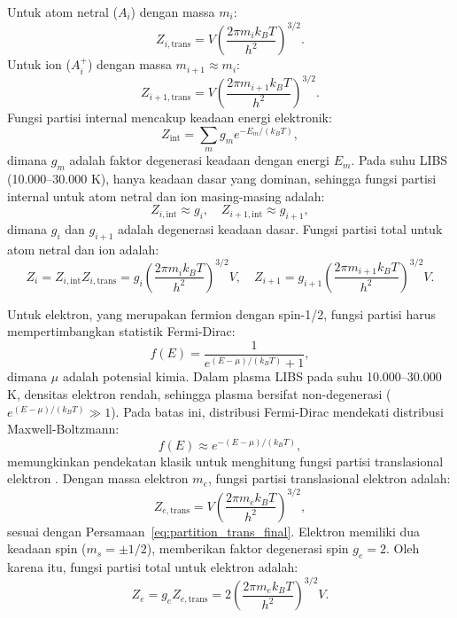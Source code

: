 Untuk atom netral (\( A_i \)) dengan massa \( m_i \):
\begin{equation}
Z_{i,\text{trans}} = V \left( \frac{2\pi m_i k_B T}{h^2} \right)^{3/2}. \label{eq:partition_trans_neutral}
\end{equation}
Untuk ion (\( A_i^+ \)) dengan massa \( m_{i+1} \approx m_i \):
\begin{equation}
Z_{i+1,\text{trans}} = V \left( \frac{2\pi m_{i+1} k_B T}{h^2} \right)^{3/2}. \label{eq:partition_trans_ion}
\end{equation}
Fungsi partisi internal mencakup keadaan energi elektronik:
\begin{equation}
Z_{\text{int}} = \sum_m g_m e^{-E_m/(k_B T)}, \label{eq:partition_internal}
\end{equation}
dimana \( g_m \) adalah faktor degenerasi keadaan dengan energi \( E_m \). Pada suhu LIBS (10.000–30.000 K), hanya keadaan dasar yang dominan, sehingga fungsi partisi internal untuk atom netral dan ion masing-masing adalah:
\[
Z_{i,\text{int}} \approx g_i, \quad Z_{i+1,\text{int}} \approx g_{i+1},
\]
dimana \( g_i \) dan \( g_{i+1} \) adalah degenerasi keadaan dasar. Fungsi partisi total untuk atom netral dan ion adalah:
\begin{equation}
Z_i = Z_{i,\text{int}} Z_{i,\text{trans}} = g_i \left( \frac{2\pi m_i k_B T}{h^2} \right)^{3/2} V, \quad Z_{i+1} = g_{i+1} \left( \frac{2\pi m_{i+1} k_B T}{h^2} \right)^{3/2} V. \label{eq:partition_total}
\end{equation}

Untuk elektron, yang merupakan fermion dengan spin-1/2, fungsi partisi harus mempertimbangkan statistik Fermi-Dirac:
\begin{equation}
f(E) = \frac{1}{e^{(E - \mu)/(k_B T)} + 1}, \label{eq:fermi_dirac}
\end{equation}
dimana \( \mu \) adalah potensial kimia. Dalam plasma LIBS pada suhu 10.000–30.000 K, densitas elektron rendah, sehingga plasma bersifat non-degenerasi (\( e^{(E - \mu)/(k_B T)} \gg 1 \)). Pada batas ini, distribusi Fermi-Dirac mendekati distribusi Maxwell-Boltzmann:
\begin{equation}
f(E) \approx e^{-(E - \mu)/(k_B T)}, \label{eq:fermi_dirac_approx}
\end{equation}
memungkinkan pendekatan klasik untuk menghitung fungsi partisi translasional elektron \citep{Pathria2011}. Dengan massa elektron \( m_e \), fungsi partisi translasional elektron adalah:
\begin{equation}
Z_{e,\text{trans}} = V \left( \frac{2\pi m_e k_B T}{h^2} \right)^{3/2}, \label{eq:partition_trans_electron}
\end{equation}
sesuai dengan Persamaan~\eqref{eq:partition_trans_final}. Elektron memiliki dua keadaan spin (\( m_s = \pm 1/2 \)), memberikan faktor degenerasi spin \( g_e = 2 \). Oleh karena itu, fungsi partisi total untuk elektron adalah:
\begin{equation}
Z_e = g_e Z_{e,\text{trans}} = 2 \left( \frac{2\pi m_e k_B T}{h^2} \right)^{3/2} V. \label{eq:partition_electron}
\end{equation}

